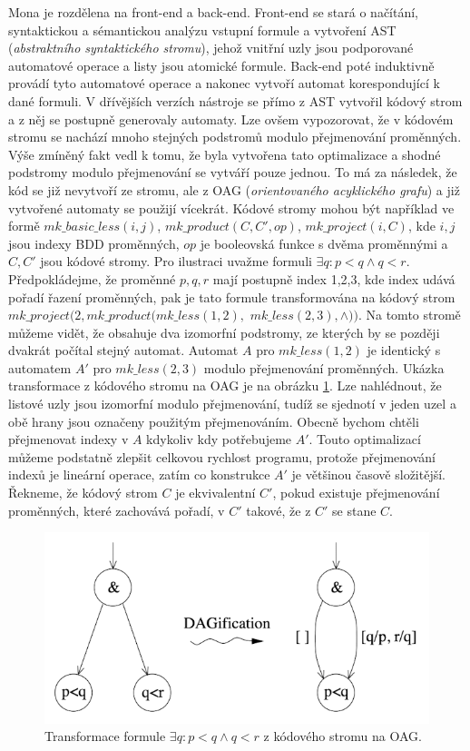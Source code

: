 Mona je rozdělena na front-end a back-end. Front-end se stará o načítání, syntaktickou a sémantickou analýzu vstupní formule a vytvoření AST (\textit{abstraktního syntaktického stromu}), jehož vnitřní uzly jsou podporované automatové operace a listy jsou atomické formule. Back-end poté induktivně provádí tyto automatové operace a nakonec vytvoří automat korespondující k dané formuli. V dřívějších verzích nástroje se přímo z AST vytvořil kódový strom a z něj se postupně generovaly automaty. Lze ovšem vypozorovat, že v kódovém stromu se nachází mnoho stejných podstromů modulo přejmenování proměnných. Výše zmíněný fakt vedl k tomu, že byla vytvořena tato optimalizace a shodné podstromy modulo přejmenování se vytváří pouze jednou. To má za následek, že kód se již nevytvoří ze stromu, ale z OAG (\textit{orientovaného acyklického grafu}) a již vytvořené automaty se použijí vícekrát. Kódové stromy mohou být například ve formě $ mk\_basic\_less(i,j) $, $ mk\_product(C,C',op) $, $ mk\_project(i,C) $, kde $i,j$ jsou indexy BDD proměnných, $op$ je booleovská funkce s dvěma proměnnými a $C,C'$ jsou kódové stromy. Pro ilustraci uvažme formuli $ \exists q: p < q \wedge q < r $. Předpokládejme, že proměnné $p,q,r$ mají postupně index 1,2,3, kde index udává pořadí řazení proměnných, pak je tato formule transformována na kódový strom $ mk\_project(2, mk\_product(mk\_less(1,2),$ $mk\_less(2,3), \wedge )) $. Na tomto stromě můžeme vidět, že obsahuje dva izomorfní podstromy, ze kterých by se později dvakrát počítal stejný automat. Automat $A$ pro $mk\_less(1,2)$ je identický s automatem $A'$ pro  $mk\_less(2,3)$ modulo přejmenování proměnných. Ukázka transformace z kódového stromu na OAG je na obrázku \ref{dagifikace}. Lze nahlédnout, že listové uzly jsou izomorfní modulo přejmenování, tudíž se sjednotí v jeden uzel a obě hrany jsou označeny použitým přejmenováním. Obecně bychom chtěli přejmenovat indexy v $A$ kdykoliv kdy potřebujeme $A'$. Touto optimalizací můžeme podstatně zlepšit celkovou rychlost programu, protože přejmenování indexů je lineární operace, zatím co konstrukce $A'$ je většinou časově složitější. Řekneme, že kódový strom $C$ je ekvivalentní $C'$, pokud existuje přejmenování proměnných, které zachovává pořadí, v $C'$ takové, že z $C'$ se stane $C$.

\begin{figure}
    \centering
    \includegraphics[scale=0.6]{obrazky-figures/dagifikace.png}
    \caption{Transformace formule $ \exists q: p < q \wedge q < r $ z kódového stromu na OAG.}
    \label{dagifikace}
\end{figure}

